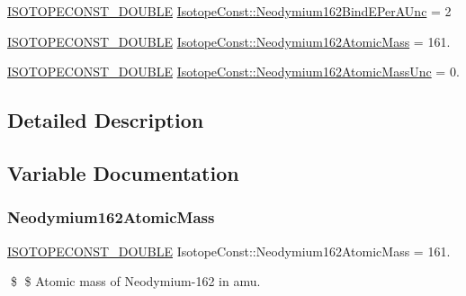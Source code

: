 \begin{DoxyCompactItemize}
\mbox{\hyperlink{group___isotope_const-_macros_ga8f45a7272ce02c0b4c65c44636ed719a}{I\+S\+O\+T\+O\+P\+E\+C\+O\+N\+S\+T\+\_\+\+D\+O\+U\+B\+LE}} \mbox{\hyperlink{group___isotope_const-_neodymium-_nd162_gad2d853b1282e4381d0ced3630250f0bf}{Isotope\+Const\+::\+Neodymium162\+Bind\+E\+Per\+A\+Unc}} = 2
\item 
\mbox{\hyperlink{group___isotope_const-_macros_ga8f45a7272ce02c0b4c65c44636ed719a}{I\+S\+O\+T\+O\+P\+E\+C\+O\+N\+S\+T\+\_\+\+D\+O\+U\+B\+LE}} \mbox{\hyperlink{group___isotope_const-_neodymium-_nd162_gad86bc461fee4f3f494399ffe3abcffc0}{Isotope\+Const\+::\+Neodymium162\+Atomic\+Mass}} = 161.
\item 
\mbox{\hyperlink{group___isotope_const-_macros_ga8f45a7272ce02c0b4c65c44636ed719a}{I\+S\+O\+T\+O\+P\+E\+C\+O\+N\+S\+T\+\_\+\+D\+O\+U\+B\+LE}} \mbox{\hyperlink{group___isotope_const-_neodymium-_nd162_gafb4fe8189df1133fd4217794f539cd21}{Isotope\+Const\+::\+Neodymium162\+Atomic\+Mass\+Unc}} = 0.
\end{DoxyCompactItemize}


\subsection{Detailed Description}


\subsection{Variable Documentation}
\mbox{\label{group___isotope_const-_neodymium-_nd162_gad86bc461fee4f3f494399ffe3abcffc0}} 
\subsubsection{\texorpdfstring{Neodymium162\+Atomic\+Mass}{Neodymium162AtomicMass}}
{\footnotesize\ttfamily \mbox{\hyperlink{group___isotope_const-_macros_ga8f45a7272ce02c0b4c65c44636ed719a}{I\+S\+O\+T\+O\+P\+E\+C\+O\+N\+S\+T\+\_\+\+D\+O\+U\+B\+LE}} Isotope\+Const\+::\+Neodymium162\+Atomic\+Mass = 161.}

\$ \$ Atomic mass of Neodymium-\/162 in amu. \mbox{\label{group___isotope_const-_neodymium-_nd162_gafb4fe8189df1133fd4217794f539cd21}} 

